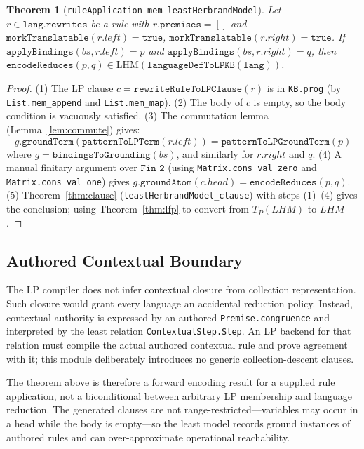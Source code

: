 \documentclass[]{article}
\newtheorem{theorem}{Theorem}
\newcommand{\code}[1]{\texttt{#1}}
\begin{document}
\begin{theorem}[\code{ruleApplication\_mem\_leastHerbrandModel}]
\label{thm:topRule}
Let $r \in \code{lang.rewrites}$ be a rule with $r.\code{premises} = []$
and $\code{morkTranslatable}(r.left) = \code{true}$,
$\code{morkTranslatable}(r.right) = \code{true}$.
If $\code{applyBindings}(bs, r.left) = p$ and
$\code{applyBindings}(bs, r.right) = q$,
then
$\code{encodeReduces}(p, q) \in \mathrm{LHM}(\code{languageDefToLPKB}(\code{lang}))$.
\end{theorem}

\begin{proof}
(1) The LP clause $c = \code{rewriteRuleToLPClause}(r)$ is in \code{KB.prog}
(by \code{List.mem\_append} and \code{List.mem\_map}).
(2) The body of $c$ is empty, so the body condition is vacuously satisfied.
(3) The commutation lemma (Lemma~\ref{lem:commute}) gives:
\[
  g.\code{groundTerm}(\code{patternToLPTerm}(r.left)) = \code{patternToLPGroundTerm}(p)
\]
where $g = \code{bindingsToGrounding}(bs)$, and similarly for $r.right$ and $q$.
(4) A manual finitary argument over $\code{Fin 2}$ (using
\code{Matrix.cons\_val\_zero} and \code{Matrix.cons\_val\_one}) gives
$g.\code{groundAtom}(c.head) = \code{encodeReduces}(p, q)$.
(5) Theorem~\ref{thm:clause} (\code{leastHerbrandModel\_clause}) with steps (1)--(4)
gives the conclusion; using Theorem~\ref{thm:lfp} to convert from $T_P(LHM)$ to $LHM$.
\end{proof}

\subsection{Authored Contextual Boundary}

The LP compiler does not infer contextual closure from collection
representation.  Such closure would grant every language an accidental
reduction policy.  Instead, contextual authority is expressed by an authored
\code{Premise.congruence} and interpreted by the least relation
\code{ContextualStep.Step}.  An LP backend for that relation must compile the
actual authored contextual rule and prove agreement with it; this module
deliberately introduces no generic collection-descent clauses.

The theorem above is therefore a forward encoding result for a supplied rule
application, not a biconditional between arbitrary LP membership and language
reduction.  The generated clauses are not range-restricted---variables may
occur in a head while the body is empty---so the least model records ground
instances of authored rules and can over-approximate operational reachability.
\end{document}
